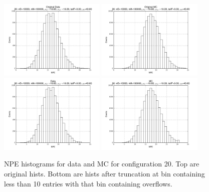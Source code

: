  \begin{figure}[htbp] \begin{center} 
\includegraphics[width=0.45\textwidth]{../FIGURES/20/FIG_Original_Data.pdf} 
\includegraphics[width=0.45\textwidth]{../FIGURES/20/FIG_Original_MC.pdf} 
\includegraphics[width=0.45\textwidth]{../FIGURES/20/FIG_Data.pdf} 
\includegraphics[width=0.45\textwidth]{../FIGURES/20/FIG_MC.pdf} 
\caption{NPE histograms for data and MC for configuration 20. Top are original hists. Bottom are hists after truncation at bin containing less than 10 entries with that bin containing overflows.} 
\label{tab:npe_20} 
\end{center} \end{figure} 

 